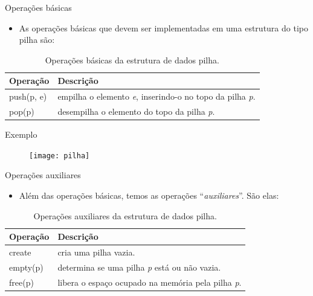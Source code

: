   \begin{frame}{Operações básicas}     
			\begin{itemize}
				\item As operações básicas que devem ser implementadas em uma estrutura do tipo pilha são:
			\end{itemize}
			\begin{table}[ht]
			  \centering
						\begin{tabular}{l|l}
						    \hline \textbf{Operação} & \textbf{Descrição} \\
						    \hline push(p, e) & empilha o elemento \textit{e}, inserindo-o no topo da pilha \textit{p}.\\
						    \hline pop(p) & desempilha o elemento do topo da pilha \textit{p}.\\
						    \hline 
						\end{tabular}
						\caption{Operações básicas da estrutura de dados pilha.}
				\end{table}
  \end{frame}
  
   \begin{frame}[c]{Exemplo} 
		   	\begin{figure}[!htpb]
				\centering
				\texttt{[image: pilha]}
			\end{figure} 
   \end{frame}
  
   \begin{frame}{Operações auxiliares}   
			\begin{itemize}
				\item Além das operações básicas, temos as operações ``\textit{auxiliares}''. São elas:
			\end{itemize}
			\begin{table}[ht]
			  \centering
						\begin{tabular}{l|l}
						    \hline \textbf{Operação} & \textbf{Descrição} \\
						    \hline create & cria uma pilha vazia.\\
						    \hline empty(p) & determina se uma pilha \textit{p} está ou não vazia.\\
						    \hline free(p) & libera o espaço ocupado na memória pela pilha \textit{p}.\\
						    \hline 
						\end{tabular}
						\caption{Operações auxiliares da estrutura de dados pilha.}
				\end{table}
  \end{frame}
  
